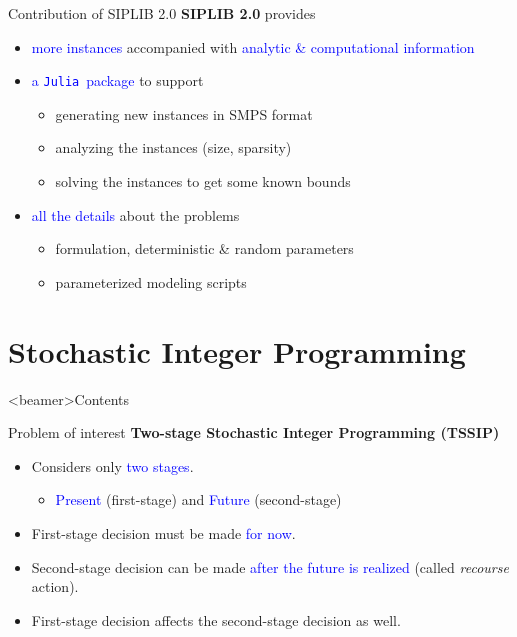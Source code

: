 \documentclass{beamer}
\newcommand{\siplibtwo}{\textsf{SIPLIB 2.0}}
\newcommand{\julia}{\texttt{Julia}}
\begin{document}
	\begin{frame}{Contribution of \siplibtwo}
		\textbf{\siplibtwo} provides
		\begin{itemize}
			\item \textcolor{blue}{more instances} accompanied with \textcolor{blue}{analytic \& computational information}
			\item \textcolor{blue}{a \julia\ package} to support
			\begin{itemize}
				\item generating new instances in SMPS format
				\item analyzing the instances (size, sparsity)
				\item solving the instances to get some known bounds
			\end{itemize}
			\item \textcolor{blue}{all the details} about the problems
			\begin{itemize}
				\item formulation, deterministic \& random parameters
				\item parameterized modeling scripts
			\end{itemize}
		\end{itemize}
	\end{frame}
	
	\section{Stochastic Integer Programming}
	
	\begin{frame}<beamer>{Contents}
	\end{frame}
	
	\begin{frame}{Problem of interest}
	\textbf{{Two-stage Stochastic Integer Programming (TSSIP)}}
	\begin{itemize}
		\item Considers only \textcolor{blue}{two stages}.
			\begin{itemize}
				\item \textcolor{blue}{Present} (first-stage) and \textcolor{blue}{Future} (second-stage)
			\end{itemize} 
		\item First-stage decision must be made \textcolor{blue}{for now}.
		\item Second-stage decision can be made \textcolor{blue}{after the future is realized} (called \textit{recourse} action).
		\item First-stage decision affects the second-stage decision as well.
	\end{itemize}
	\end{frame}
	
\end{document}
